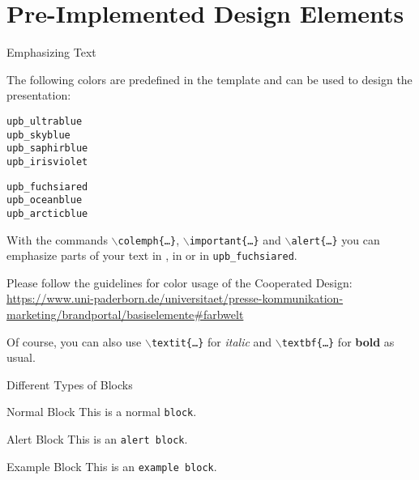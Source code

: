 \documentclass[
	aspectratio=169
	] {beamer}
\begin{document}
\section{Pre-Implemented Design Elements}
\begin{frame}{Emphasizing Text}
\small
\begin{minipage}{.46\linewidth}
The following colors are predefined in the template and can be used to design the presentation:\\


\begin{minipage}{.49\linewidth}
\texttt{\color{upb_ultrablue}upb\_ultrablue}\\
\texttt{\color{upb_skyblue}upb\_skyblue}\\
\texttt{\color{upb_saphirblue}upb\_saphirblue}\\
\texttt{\color{upb_irisviolet}upb\_irisviolet}\\
\end{minipage}
\begin{minipage}{.49\linewidth}
\texttt{\color{upb_fuchsiared}upb\_fuchsiared}\\
\texttt{\color{upb_oceanblue}upb\_oceanblue}\\
\texttt{\color{upb_arcticblue}upb\_arcticblue}
\end{minipage}


\end{minipage}
\hfill
\begin{minipage}{.4\linewidth}
	With the commands \texttt{$\backslash$colemph\{\ldots\}},
	\texttt{$\backslash$important\{\ldots\}} and \texttt{$\backslash$alert\{\ldots\}} you can emphasize parts of your text
	in , in  or in \alert{\texttt{upb\_fuchsiared}}.
\end{minipage}


\footnotesize
Please follow the guidelines for color usage of the Cooperated Design:\\
\url{https://www.uni-paderborn.de/universitaet/presse-kommunikation-marketing/brandportal/basiselemente\#farbwelt}

\vfill
Of course, you can also use \texttt{$\backslash$textit\{\ldots\}} for \textit{italic} and \texttt{$\backslash$textbf\{\ldots\}} for \textbf{bold} as usual.
\end{frame}

\begin{frame}{Different Types of Blocks}
	\begin{block}{Normal Block}
		This is a normal \texttt{block}.
	\end{block}

	\begin{alertblock}{Alert Block}
		This is an \texttt{alert block}.
	\end{alertblock}

	\begin{exampleblock}{Example Block}
		This is an \texttt{example block}.
	\end{exampleblock}
\end{frame}


\renewcommand{\thankyou}{Thank you very much for your attention!}
\renewcommand{\subthankyou}{I look forward to an exciting discussion!}
\renewcommand{\authormail}{author@upb.de}
\thankyouframe
\end{document}
